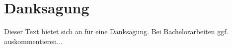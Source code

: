 \chapter{Danksagung}
Dieser Text bietet sich an für eine Danksagung. Bei Bachelorarbeiten ggf. auskommentieren... 
